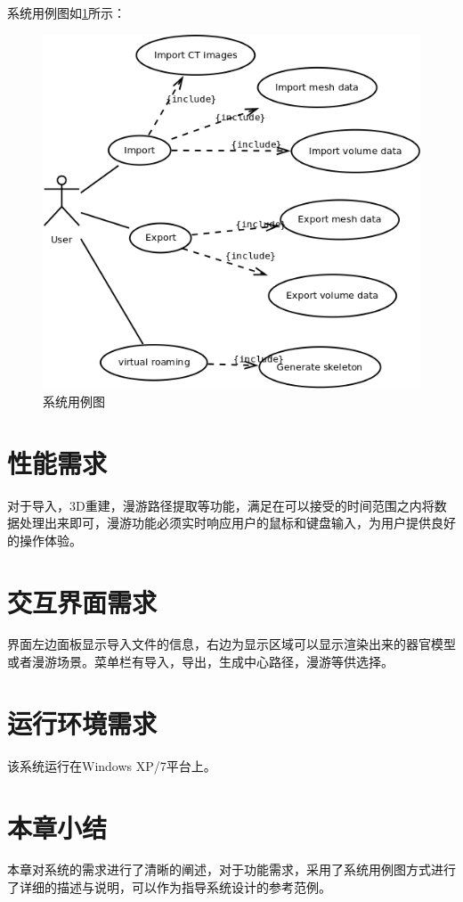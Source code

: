 系统用例图如\ref{use_case}所示：
\begin{figure}[h!]
    \centering
    \includegraphics[width=400bp]{figure/use_case.png}
    \caption{系统用例图}
    \label{use_case}
\end{figure}

\section{性能需求}
对于导入，3D重建，漫游路径提取等功能，满足在可以接受的时间范围之内将数据处理出来即可，漫游功能必须实时响应用户的鼠标和键盘输入，为用户提供良好的操作体验。

\section{交互界面需求}
界面左边面板显示导入文件的信息，右边为显示区域可以显示渲染出来的器官模型或者漫游场景。菜单栏有导入，导出，生成中心路径，漫游等供选择。

\section{运行环境需求}
该系统运行在Windows XP/7平台上。

\section{本章小结}
本章对系统的需求进行了清晰的阐述，对于功能需求，采用了系统用例图方式进行了详细的描述与说明，可以作为指导系统设计的参考范例。

